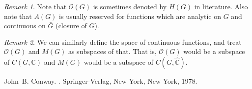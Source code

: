 \documentclass[12pt]{article}
\theoremstyle{theorem}
\theoremstyle{definition}
\theoremstyle{remark}
\newtheorem*{rmk}{Remark}
\begin{document}
\begin{rmk}
Note that ${\mathcal{O}}(G)$ is sometimes denoted by $H(G)$ in literature.  Also note that $A(G)$ is usually reserved for functions which are
analytic on $G$ and continuous on $\bar{G}$ (closure of $G$).
\end{rmk}

\begin{rmk}
We can similarly define the space of continuous functions, and treat ${\mathcal{O}}(G)$ and $M(G)$ as subspaces of that.  That is, ${\mathcal{O}}(G)$
would be a subspace of $C(G,{\mathbb{C}})$ and $M(G)$ would be a subspace
of $C(G,\hat{\mathbb{C}})$.
\end{rmk}

\begin{thebibliography}{9}
John~B. Conway.
{\em {}}.
Springer-Verlag, New York, New York, 1978.
\end{thebibliography}
\end{document}
